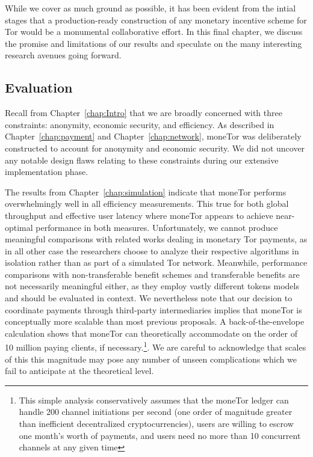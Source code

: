 While we cover as much ground as possible, it has been evident from the intial
stages that a production-ready construction of any monetary incentive scheme for
Tor would be a monumental collaborative effort. In this final chapter, we
discuss the promise and limitations of our results and speculate on the many
interesting research avenues going forward.

\subsection{Evaluation}
\label{subsec:evaluation}
Recall from Chapter~\ref{chap:Intro} that we are broadly concerned with three
constraints: anonymity, economic security, and efficiency. As described in
Chapter~\ref{chap:payment} and Chapter~\ref{chap:network}, moneTor was
deliberately constructed to account for anonymity and economic security. We did
not uncover any notable design flaws relating to these constraints during our
extensive implementation phase.

The results from Chapter~\ref{chap:simulation} indicate that moneTor performs
overwhelmingly well in all efficiency measurements. This true for both global
throughput and effective user latency where moneTor appears to achieve
near-optimal performance in both measures. Unfortunately, we cannot produce
meaningful comparisons with related works dealing in monetary Tor payments, as
in all other case the researchers choose to analyze their respective algorithms
in isolation rather than as part of a simulated Tor network. Meanwhile,
performance comparisons with non-transferable benefit schemes and transferable
benefits are not necessarily meaningful either, as they employ vastly different
tokens models and should be evaluated in context. We nevertheless note that our
decision to coordinate payments through third-party intermediaries implies that
moneTor is conceptually more scalable than most previous proposals. A
back-of-the-envelope calculation shows that moneTor can theoretically
accommodate on the order of 10 million paying clients, if
necessary.\footnote{This simple analysis conservatively assumes that the moneTor
  ledger can handle 200 channel initiations per second (one order of magnitude
  greater than inefficient decentralized cryptocurrencies), users are willing to
  escrow one month's worth of payments, and users need no more than 10 concurrent
  channels at any given time}. We are careful to acknowledge that scales
of this this magnitude may pose any number of unseen complications which we fail
to anticipate at the theoretical level.

